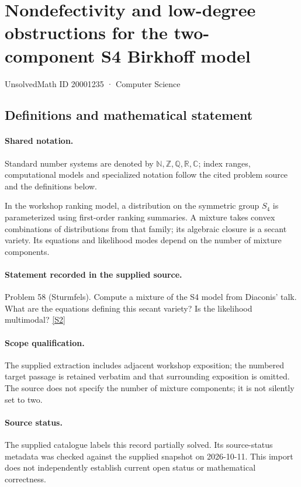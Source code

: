 \documentclass[11pt]{article}
\newcommand{\sref}[2]{\hyperlink{source:#1:#2}{[S#2]}}
\begin{document}
\setcounter{section}{20001234}
\section{Nondefectivity and low-degree obstructions for the two-component S4 Birkhoff model}\label{20001235}
{\small\sffamily UnsolvedMath ID 20001235 · Computer Science}
\subsection{Definitions and mathematical statement}

\paragraph{Shared notation.}Standard number systems are denoted by $\mathbb N,\mathbb Z,\mathbb Q,\mathbb R,\mathbb C$; index ranges, computational models and specialized notation follow the cited problem source and the definitions below.


In the workshop ranking model, a distribution on the symmetric group $S_4$ is parameterized using first-order ranking summaries. A mixture takes convex combinations of distributions from that family; its algebraic closure is a secant variety. Its equations and likelihood modes depend on the number of mixture components.
\paragraph{Statement recorded in the supplied source.}
Problem 58 (Sturmfels). Compute a mixture of the S4 model from Diaconis' talk. What are the equations defining this secant variety? Is the likelihood multimodal? \sref{20001235}{2}
\paragraph{Scope qualification.}
The supplied extraction includes adjacent workshop exposition; the numbered target passage is retained verbatim and that surrounding exposition is omitted. The source does not specify the number of mixture components; it is not silently set to two.
\paragraph{Source status.}
The supplied catalogue labels this record partially solved. Its source-status metadata was checked against the supplied snapshot on 2026-10-11. This import does not independently establish current open status or mathematical correctness.
\end{document}
